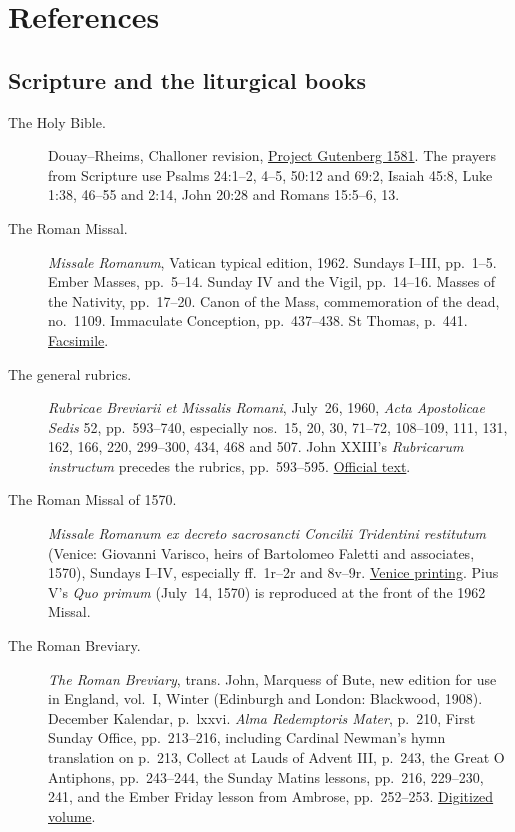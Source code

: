 \section{References}

\subsection{Scripture and the liturgical books}

\begin{description}
\item[The Holy Bible.] Douay--Rheims, Challoner revision,
  \href{https://www.gutenberg.org/ebooks/1581}{Project Gutenberg 1581}.
  The prayers from Scripture use Psalms 24:1--2, 4--5, 50:12 and 69:2,
  Isaiah 45:8, Luke 1:38, 46--55 and 2:14, John 20:28 and Romans
  15:5--6, 13.

\item[The Roman Missal.] \textit{Missale Romanum}, Vatican typical edition,
  1962. Sundays I--III, pp.~1--5. Ember Masses, pp.~5--14.
  Sunday IV and the Vigil, pp.~14--16. Masses of the Nativity,
  pp.~17--20. Canon of the Mass, commemoration of the dead, no.~1109.
  Immaculate Conception, pp.~437--438. St Thomas, p.~441. \href{https://musicasacra.com/pdf/missale62.pdf}{Facsimile}.

\item[The general rubrics.] \textit{Rubricae Breviarii et Missalis Romani},
  July~26, 1960, \textit{Acta Apostolicae Sedis} 52, pp.~593--740,
  especially nos.~15, 20, 30, 71--72, 108--109, 111, 131, 162,
  166, 220, 299--300,
  434, 468 and 507. John XXIII's \textit{Rubricarum instructum}
  precedes the rubrics, pp.~593--595.
  \href{https://www.vatican.va/archive/aas/documents/AAS-52-1960-ocr.pdf}{Official text}.

\item[The Roman Missal of 1570.] \textit{Missale Romanum ex decreto
  sacrosancti Concilii Tridentini restitutum} (Venice: Giovanni Varisco,
  heirs of Bartolomeo Faletti and associates, 1570), Sundays I--IV,
  especially ff.~1r--2r and 8v--9r.
  \href{https://archive.org/details/messale-tridentino-di-san-pio-v-1570}{Venice printing}.
  Pius V's \textit{Quo primum} (July~14, 1570) is reproduced at the
  front of the 1962 Missal.

\item[The Roman Breviary.] \textit{The Roman Breviary}, trans. John,
  Marquess of Bute, new edition for use in England, vol.~I, Winter
  (Edinburgh and London: Blackwood, 1908).
  December Kalendar, p.~lxxvi. \textit{Alma Redemptoris Mater}, p.~210,
  First Sunday Office, pp.~213--216, including Cardinal Newman's hymn
  translation on p.~213, Collect at Lauds of Advent III,
  p.~243, the Great O Antiphons, pp.~243--244, the Sunday Matins
  lessons, pp.~216, 229--230, 241, and the Ember Friday
  lesson from Ambrose, pp.~252--253.
  \href{https://archive.org/details/romanbreviaryref01cathuoft}{Digitized volume}.


\end{description}
